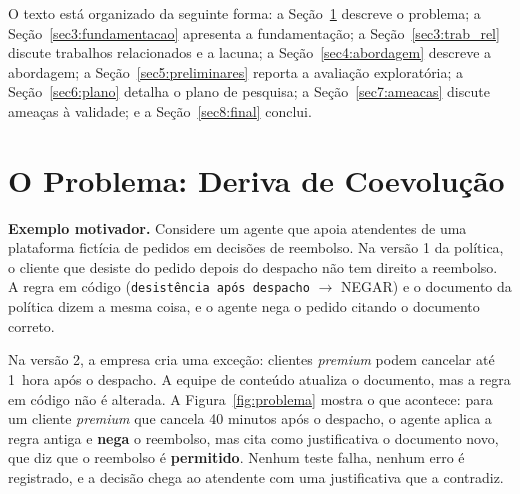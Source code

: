 \documentclass[12pt]{article}
\newcommand{\code}[1]{\texttt{#1}}
\begin{document}
O texto está organizado da seguinte forma: a Seção~\ref{sec2:problema} descreve o problema; a Seção~\ref{sec3:fundamentacao} apresenta a fundamentação; a Seção~\ref{sec3:trab_rel} discute trabalhos relacionados e a lacuna; a Seção~\ref{sec4:abordagem} descreve a abordagem; a Seção~\ref{sec5:preliminares} reporta a avaliação exploratória; a Seção~\ref{sec6:plano} detalha o plano de pesquisa; a Seção~\ref{sec7:ameacas} discute ameaças à validade; e a Seção~\ref{sec8:final} conclui.

\section{O Problema: Deriva de Coevolução}
\label{sec2:problema}

\textbf{Exemplo motivador.} Considere um agente que apoia atendentes de uma plataforma fictícia de pedidos em decisões de reembolso. Na versão 1 da política, o cliente que desiste do pedido depois do despacho não tem direito a reembolso. A regra em código (\code{desistência após despacho} $\rightarrow$ NEGAR) e o documento da política dizem a mesma coisa, e o agente nega o pedido citando o documento correto.

Na versão 2, a empresa cria uma exceção: clientes \textit{premium} podem cancelar até 1~hora após o despacho. A equipe de conteúdo atualiza o documento, mas a regra em código não é alterada. A Figura~\ref{fig:problema} mostra o que acontece: para um cliente \textit{premium} que cancela 40 minutos após o despacho, o agente aplica a regra antiga e \textbf{nega} o reembolso, mas cita como justificativa o documento novo, que diz que o reembolso é \textbf{permitido}. Nenhum teste falha, nenhum erro é registrado, e a decisão chega ao atendente com uma justificativa que a contradiz.
\end{document}
